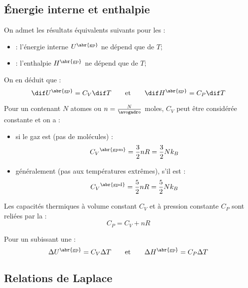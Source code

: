 \subsection{Énergie interne et enthalpie}

\begin{propriete}[admis]
On admet les résultats équivalents suivants pour les  :
\begin{itemize}
\item {} : l'énergie interne $U^{\text{\abr{gp}}}$ ne dépend que de $T$;

\item {} : l'enthalpie $H^{\text{\abr{gp}}}$ ne dépend que de $T$;
\end{itemize}

\noindent On en déduit que :
\[\dif U^{\text{\abr{gp}}} = C_V \dif T \qquad \text{et} \qquad \dif H^{\text{\abr{gp}}} = C_P \dif T\]
\end{propriete}

\begin{propriete}[admis]
Pour un  contenant $N$ atomes ou $n = \frac{N}{\avogadro}$ moles, $C_V$ peut être considérée constante et on a  :
\begin{itemize}
\item si le gaz est  (pas de molécules) :
\[{C_V}^{\text{\abr{gpm}}} = \frac{3}{2} nR = \frac{3}{2} N k_B\]

\item généralement (pas aux températures extrêmes), s'il est  :
\[{C_V}^{\text{\abr{gpd}}} = \frac{5}{2} nR = \frac{5}{2} N k_B\]
\end{itemize}
\end{propriete}

\begin{propriete}
Les capacités thermiques à volume constant $C_V$ et à pression constante $C_P$ sont reliées par la  :
\[C_P = C_V + nR\]
\end{propriete}

\begin{propriete}
Pour un  subissant une  :
\[\Delta U^{\text{\abr{gp}}} = C_V \Delta T \qquad \text{et} \qquad \Delta H^{\text{\abr{gp}}} = C_P \Delta T\]
\end{propriete}



\subsection{Relations de Laplace}

